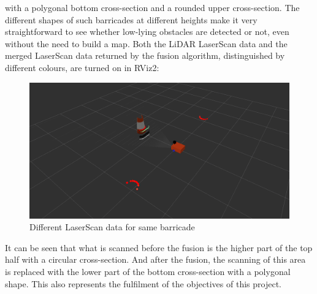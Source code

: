 with a polygonal bottom cross-section and a rounded upper cross-section.
The different shapes of such barricades at different heights make it very straightforward 
to see whether low-lying obstacles are detected or not, 
even without the need to build a map. 
Both the LiDAR LaserScan data and the merged LaserScan data returned by the fusion algorithm, 
distinguished by different colours, are turned on in RViz2:
\begin{figure}[H]
    \centering
    \includegraphics[width=0.8\linewidth]{figs/barricade.png}
    \caption{Different LaserScan data for same barricade}
\end{figure}
It can be seen that what is scanned before the fusion 
is the higher part of the top half with a circular cross-section.
And after the fusion, the scanning of this area is replaced with the lower part of the bottom cross-section 
with a polygonal shape. This also represents the fulfilment of the objectives of this project.




